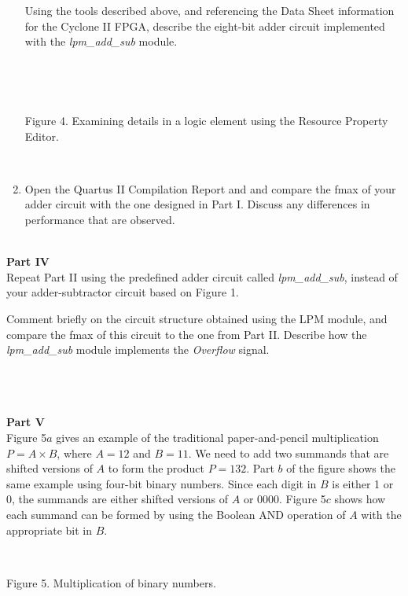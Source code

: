 \documentclass[psfig,10pt,fullpage]{article}
\begin{document}
\begin{enumerate}
Using the tools described above, and referencing the Data Sheet information for the
Cyclone II FPGA, describe the eight-bit adder circuit implemented with
the {\it lpm\_add\_sub} module.

~\\
\begin{figure}[H]
\scriptsize
\centerline{
\hbox{}}
\end{figure}
~\\
\centerline{Figure 4.  Examining details in a logic element using the Resource Property
Editor.}
~\\

\item Open the Quartus II Compilation Report and and compare the fmax of your adder 
circuit with the one designed in Part I. Discuss any differences in performance that are observed.
\end{enumerate}

~\\
\noindent
{\bf Part IV}
~\\

\noindent
Repeat Part II using the predefined adder circuit called {\it lpm\_add\_sub}, instead of your
adder-subtractor circuit based on Figure 1.

Comment briefly on the circuit structure obtained using the LPM module, and compare 
the fmax of this circuit to the one from Part II. Describe how the 
{\it lpm\_add\_sub} module implements the {\it Overflow} signal.

\newpage
\noindent
~\\
~\\
~\\
{\bf Part V}
~\\

\noindent
Figure 5$a$ gives an example of the traditional paper-and-pencil multiplication $P = A
\times B$, where $A = 12$ and $B = 11$. We need to add two summands that are shifted versions of
$A$ to form the product $P = 132$. Part $b$ of the figure shows the same example using
four-bit binary numbers. Since each digit in $B$ is either 1 or 0, the summands are either
shifted versions of $A$ or 0000. Figure 5$c$ shows how each summand can be formed by using
the Boolean AND operation of $A$ with the appropriate bit in $B$.
~\\

\begin{figure}[H]
\scriptsize
\centerline{
\hbox{}}
\end{figure}
~\\
\centerline{Figure 5.  Multiplication of binary numbers.}
~\\
\end{document}
